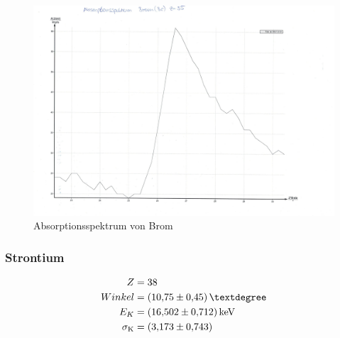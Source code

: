 \begin{figure}[h!]
  \centering
  \includegraphics[width=\textwidth]{bromgraph.pdf}
  \caption{Absorptionsspektrum von Brom}
  \label{fig:brom}
\end{figure}
\FloatBarrier

\subsubsection{Strontium}
\begin{align*}
  Z&=38\\
  Winkel&=\SI{10,75\pm0,45}{°}\\
  E_K&=\SI{16,502\pm0,712}{keV}\\
  \sigma_{\text{K}}&=\SI{3,173\pm0,743}{}
\end{align*}

